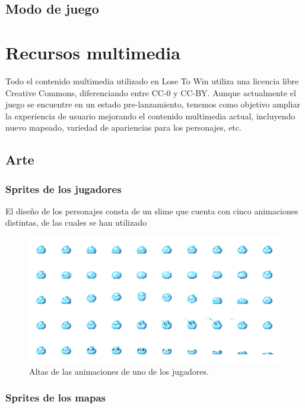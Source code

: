 \documentclass[12pt, spanish]{article}
\begin{document}
\subsection{Modo de juego}



\section{Recursos multimedia}

Todo el contenido multimedia utilizado en Lose To Win utiliza una licencia libre Creative Commons, diferenciando entre CC-0 y CC-BY. Aunque actualmente el juego se encuentre en un estado pre-lanzamiento, tenemos como objetivo ampliar la experiencia de usuario mejorando el contenido multimedia actual, incluyendo nuevo mapeado, variedad de apariencias para los personajes, etc.

\subsection{Arte}

\subsubsection{Sprites de los jugadores}

El diseño de los personajes consta de un slime que cuenta con cinco animaciones distintas, de las cuales se han utilizado

\begin{figure}[H]
	\centering
	\includegraphics[width=\textwidth]{"multimedia/blue_slime_atlas.png"}
	\caption{Altas de las animaciones de uno de los jugadores.}\label{figure:blue_slime_atlas}
\end{figure}

\subsubsection{Sprites de los mapas}
\end{document}

